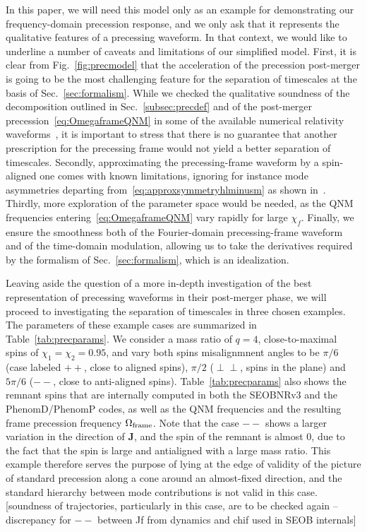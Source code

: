 \documentclass[aps,showpacs,twocolumn,
prd,superscriptaddress,nofootinbib]{revtex4-1}
\newcommand{\SM}[1]{{\color{Red} #1}}
\begin{document}
In this paper, we will need this model only as an example for demonstrating our frequency-domain precession response, and we only ask that it represents the qualitative features of a precessing waveform. In that context, we would like to underline a number of caveats and limitations of our simplified model. First, it is clear from Fig.~\ref{fig:precmodel} that the acceleration of the precession post-merger is going to be the most challenging feature for the separation of timescales at the basis of Sec.~\ref{sec:formalism}. While we checked the qualitative soundness of the decomposition outlined in Sec.~\ref{subsec:precdef} and of the post-merger precession~\eqref{eq:OmegaframeQNM} in some of the available numerical relativity waveforms~\cite{SXScatalog}, it is important to stress that there is no guarantee that another prescription for the precessing frame would not yield a better separation of timescales. Secondly, approximating the precessing-frame waveform by a spin-aligned one comes with known limitations, ignoring for instance mode asymmetries departing from~\eqref{eq:approxsymmetryhlminusm} as shown in~\cite{Boyle+14}. Thirdly, more exploration of the parameter space would be needed, as the QNM frequencies entering~\eqref{eq:OmegaframeQNM} vary rapidly for large $\chi_{f}$. Finally, we ensure the smoothness both of the Fourier-domain precessing-frame waveform and of the time-domain modulation, allowing us to take the derivatives required by the formalism of Sec.~\ref{sec:formalism}, which is an idealization.

Leaving aside the question of a more in-depth investigation of the best representation of precessing waveforms in their post-merger phase, we will proceed to investigating the separation of timescales in three chosen examples. The parameters of these example cases are summarized in Table~\ref{tab:precparams}. We consider a mass ratio of $q=4$, close-to-maximal spins of $\chi_{1} = \chi_{2} = 0.95$, and vary both spins misalignmnent angles to be $\pi/6$ (case labeled $++$, close to aligned spins), $\pi/2$ ($\perp\perp$, spins in the plane) and $5\pi/6$ ($--$, close to anti-aligned spins). Table~\ref{tab:precparams} also shows the remnant spins that are internally computed in both the SEOBNRv3 and the PhenomD/PhenomP codes, as well as the QNM frequencies and the resulting frame precession frequency $\Omega_{\rm frame}$. Note that the case $--$ shows a larger variation in the direction of $\bm{J}$, and the spin of the remnant is almost 0, due to the fact that the spin is large and antialigned with a large mass ratio. This example therefore serves the purpose of lying at the edge of validity of the picture of standard precession along a cone around an almost-fixed direction, and the standard hierarchy between mode contributions is not valid in this case. \SM{[soundness of trajectories, particularly in this case, are to be checked again -- discrepancy for $--$ between Jf from dynamics and chif used in SEOB internals]}
\end{document}

